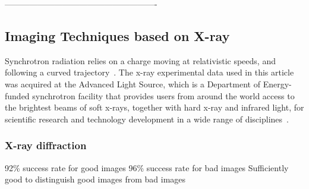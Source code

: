 -------------------------------------------------------
\subsection{Imaging Techniques based on X-ray}


Synchrotron radiation relies on a charge moving at relativistic speeds, and following a curved trajectory~\cite{url:als:booklet}. The x-ray experimental data used in this article was acquired at the Advanced Light Source, which is a Department of Energy-funded synchrotron facility that provides users from around the world access to the brightest beams of soft x-rays, together with hard x-ray and infrared light, for scientific research and technology development in a wide range of disciplines~\cite{url:als}.

\subsubsection{X-ray diffraction}\label{subsec:diffraction} %
92\% success rate for good images
96\% success rate for bad images
Sufficiently good to distinguish good images from bad images

